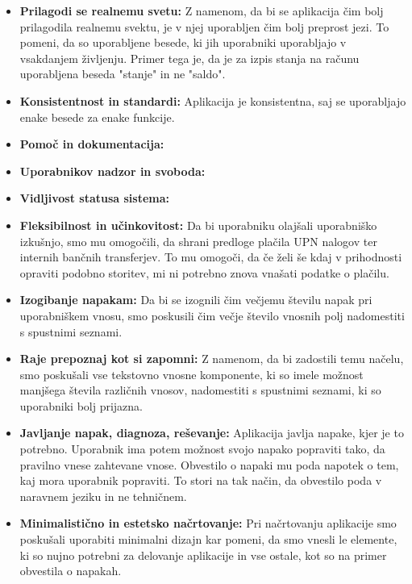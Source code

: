 \documentclass{article}
\begin{document}
\begin {itemize}
    \item \textbf{Prilagodi se realnemu svetu:} Z namenom, da bi se aplikacija čim bolj prilagodila realnemu svektu, je v njej uporabljen čim bolj preprost jezi. To pomeni, da so uporabljene besede, ki jih uporabniki uporabljajo v vsakdanjem življenju. Primer tega je, da je za izpis stanja na računu uporabljena beseda "stanje" in ne "saldo".     

    \item \textbf{Konsistentnost in standardi:} Aplikacija je konsistentna, saj se uporabljajo enake besede za enake funkcije.
    

    \item \textbf{Pomoč in dokumentacija:} 
    
    \item \textbf{Uporabnikov nadzor in svoboda:} 
    
    \item \textbf{Vidljivost statusa sistema:} 
    \item \textbf{Fleksibilnost in učinkovitost:} Da bi uporabniku olajšali uporabniško izkušnjo, smo mu omogočili, da shrani predloge plačila UPN nalogov ter internih bančnih transferjev. To mu omogoči, da če želi še kdaj v prihodnosti opraviti podobno storitev, mi ni potrebno znova vnašati podatke o plačilu.
    \item \textbf{Izogibanje napakam:} Da bi se izognili čim večjemu številu napak pri uporabniškem vnosu, smo poskusili čim večje število vnosnih polj nadomestiti s spustnimi seznami.
    \item \textbf{Raje prepoznaj kot si zapomni:} Z namenom, da bi zadostili temu načelu, smo poskušali vse tekstovno vnosne komponente, ki so imele možnost manjšega števila različnih vnosov, nadomestiti s spustnimi seznami, ki so uporabniki bolj prijazna.
    \item \textbf{Javljanje napak, diagnoza, reševanje:} Aplikacija javlja napake, kjer je to potrebno. Uporabnik ima potem možnost svojo napako popraviti tako, da pravilno vnese zahtevane vnose. Obvestilo o napaki mu poda napotek o tem, kaj mora uporabnik popraviti. To stori na tak način, da obvestilo poda v naravnem jeziku in ne tehničnem.
    \item \textbf{Minimalistično in estetsko načrtovanje:} Pri načrtovanju aplikacije smo poskušali uporabiti minimalni dizajn kar pomeni, da smo vnesli le elemente, ki so nujno potrebni za delovanje aplikacije in vse ostale, kot so na primer obvestila o napakah.
\end{itemize}
\end{document}
